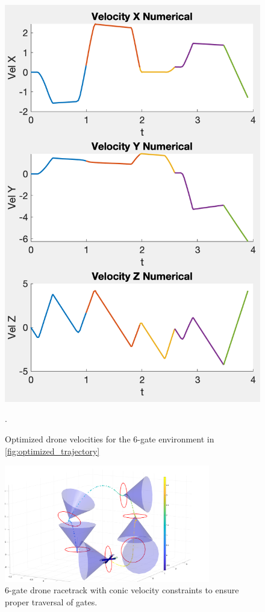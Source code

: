 \begin{figure}[htbp]
  \centering
  \includegraphics[width=1.0\columnwidth]{img/velocities.png}
  \caption{Optimized drone velocities for the 6-gate environment in \cref{fig:optimized_trajectory}}.
  \label{fig:optimized_velocities}
\end{figure}

\begin{figure}[htbp]
  \centering
  \includegraphics[width=0.8\textwidth, trim=700 0 0 0, clip]{img/DroneRaceTrajectoryOptWCones.png}
  \caption{6-gate drone racetrack with conic velocity constraints to ensure proper traversal of gates.}
  \label{fig:conics}
\end{figure}


